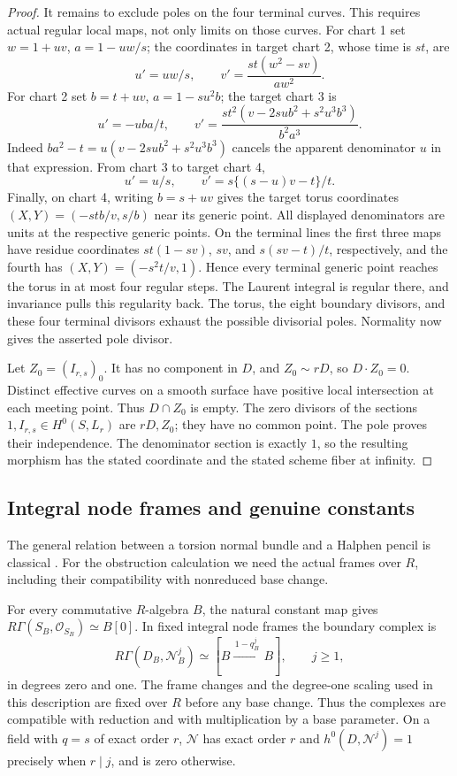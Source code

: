 \begin{proof}
It remains to exclude poles on the four terminal curves.  This
requires actual regular local maps, not only limits on those curves.
For chart 1 set $w=1+uv$, $a=1-uw/s$; the coordinates in target
chart 2, whose time is $st$, are
\[
u'=uw/s,\qquad v'=\frac{st(w^2-sv)}{aw^2}.
\]
For chart 2 set $b=t+uv$, $a=1-su^2b$; the target chart 3 is
\[
u'=-uba/t,\qquad
v'=\frac{st^2(v-2su b^2+s^2u^3b^3)}{b^2a^3}.
\]
Indeed $ba^2-t=u(v-2su b^2+s^2u^3b^3)$ cancels the apparent
denominator $u$ in that expression.  From chart 3 to target chart 4,
\[
u'=u/s,\qquad v'=s\{(s-u)v-t\}/t.
\]
Finally, on chart 4, writing $b=s+uv$ gives the target torus coordinates
$(X,Y)=(-stb/v,s/b)$ near its generic point.  All displayed
denominators are units at the respective generic points.  On the
terminal lines the first three maps have residue coordinates
$st(1-sv)$, $sv$, and $s(sv-t)/t$, respectively, and the fourth has
$(X,Y)=(-s^2t/v,1)$.  Hence every terminal generic point reaches the
torus in at most four regular steps.  The Laurent integral is regular
there, and invariance pulls this regularity back.  The torus, the eight
boundary divisors, and these four terminal divisors exhaust the
possible divisorial poles.  Normality now gives the asserted pole
divisor.

Let $Z_0=(I_{r,s})_0$.  It has no component in $D$, and
$Z_0\sim rD$, so $D\cdot Z_0=0$.  Distinct effective curves on a
smooth surface have positive local intersection at each meeting
point.  Thus $D\cap Z_0$ is empty.  The zero divisors of the sections
$1,I_{r,s}\in H^0(S,L_r)$ are $rD,Z_0$; they have no common point.
The pole proves their independence.  The denominator section is
exactly $1$, so the resulting morphism has the stated coordinate
and the stated scheme fiber at infinity.
\end{proof}

\subsection{Integral node frames and genuine constants}

The general relation between a torsion normal bundle and a Halphen
pencil is classical \cite[Proposition 2.2]{CantatDolgachev2012}.
For the obstruction calculation we need the actual frames over $R$,
including their compatibility with nonreduced base change.

\begin{lemma}\label{geom:constants}
For every commutative $R$-algebra $B$, the natural constant map gives
$R\Gamma(S_B,\mathcal O_{S_B})\simeq B[0]$.
In fixed integral node frames the boundary complex is
\begin{equation}
R\Gamma(D_B,\mathcal N_B^j)
\simeq [B\xrightarrow{\,1-q_B^j\,}B],
\qquad j\geq1,
\label{geom:boundary-complex}
\end{equation}
in degrees zero and one.  The frame changes and the degree-one
scaling used in this description are fixed over $R$ before any base
change.  Thus the complexes are compatible with reduction and with
multiplication by a base parameter.  On a field with $q=s$ of exact
order $r$, $\mathcal N$ has exact order $r$ and
$h^0(D,\mathcal N^j)=1$ precisely when $r\mid j$, and is zero otherwise.
\end{lemma}

